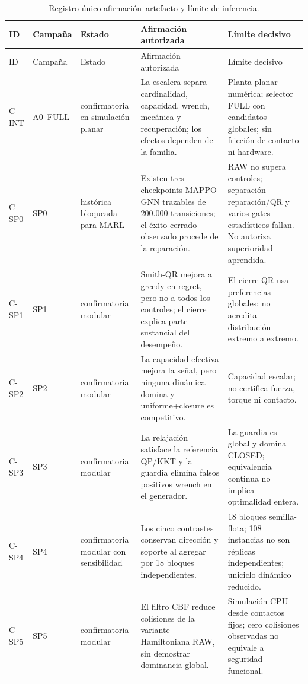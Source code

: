 \begin{landscape}
\scriptsize
\begin{longtable}{p{1.2cm}p{1.5cm}p{3.5cm}p{7.8cm}p{6.7cm}}
\caption{Registro único afirmación--artefacto y límite de inferencia.}\label{tab:claim-artifact-registry}\\
\toprule
ID & Campaña & Estado & Afirmación autorizada & Límite decisivo \\
\midrule
\endfirsthead
\toprule ID & Campaña & Estado & Afirmación autorizada & Límite decisivo \\
\midrule
\endhead
C-INT & A0--FULL & confirmatoria en simulación planar & La escalera separa cardinalidad, capacidad, wrench, mecánica y recuperación; los efectos dependen de la familia. & Planta planar numérica; selector FULL con candidatos globales; sin fricción de contacto ni hardware. \\
C-SP0 & SP0 & histórica bloqueada para MARL & Existen tres checkpoints MAPPO-GNN trazables de 200.000 transiciones; el éxito cerrado observado procede de la reparación. & RAW no supera controles; separación reparación/QR y varios gates estadísticos fallan. No autoriza superioridad aprendida. \\
C-SP1 & SP1 & confirmatoria modular & Smith-QR mejora a greedy en regret, pero no a todos los controles; el cierre explica parte sustancial del desempeño. & El cierre QR usa preferencias globales; no acredita distribución extremo a extremo. \\
C-SP2 & SP2 & confirmatoria modular & La capacidad efectiva mejora la señal, pero ninguna dinámica domina y uniforme+closure es competitivo. & Capacidad escalar; no certifica fuerza, torque ni contacto. \\
C-SP3 & SP3 & confirmatoria modular & La relajación satisface la referencia QP/KKT y la guardia elimina falsos positivos wrench en el generador. & La guardia es global y domina CLOSED; equivalencia continua no implica optimalidad entera. \\
C-SP4 & SP4 & confirmatoria modular con sensibilidad & Los cinco contrastes conservan dirección y soporte al agregar por 18 bloques independientes. & 18 bloques semilla-flota; 108 instancias no son réplicas independientes; uniciclo dinámico reducido. \\
C-SP5 & SP5 & confirmatoria modular & El filtro CBF reduce colisiones de la variante Hamiltoniana RAW, sin demostrar dominancia global. & Simulación CPU desde contactos fijos; cero colisiones observadas no equivale a seguridad funcional. \\

\end{longtable}
\end{landscape}
